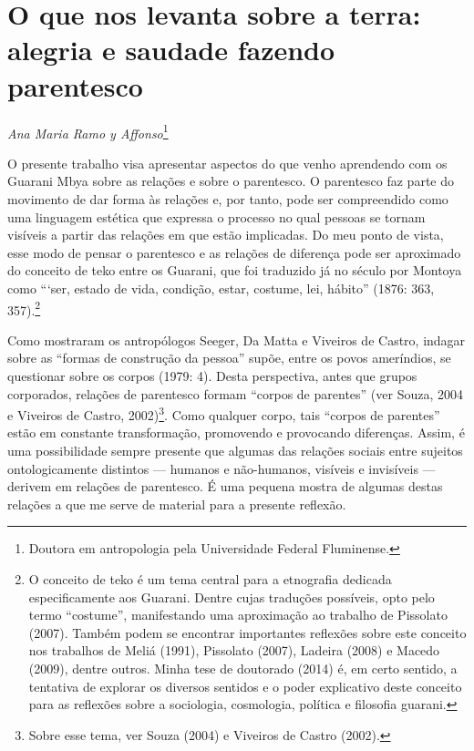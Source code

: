\chapter{O que nos levanta sobre a terra: alegria e saudade fazendo
parentesco}
\begin{flushright}
\emph{Ana Maria Ramo y Affonso}\footnote{Doutora em antropologia pela
Universidade Federal Fluminense.}
\end{flushright}

O presente trabalho visa apresentar aspectos do que venho aprendendo com
os Guarani Mbya sobre as relações e sobre o parentesco. O parentesco
faz parte do movimento de dar forma às relações e, por tanto, pode ser
compreendido como uma linguagem estética que expressa o processo no
qual pessoas se tornam visíveis a partir das relações em que estão
implicadas. Do meu ponto de vista, esse modo de pensar o parentesco e
as relações de diferença pode ser aproximado do conceito de teko entre
os Guarani, que foi traduzido já no século  por Montoya como ``‘ser,
estado de vida, condição, estar, costume, lei, hábito'' (1876: 363,
357).\footnote{O conceito de teko é um tema central para a etnografia
dedicada especificamente aos Guarani. Dentre cujas traduções possíveis,
opto pelo termo ``costume'', manifestando uma aproximação ao trabalho de
Pissolato (2007). Também podem se encontrar importantes reflexões sobre
este conceito nos trabalhos de Meliá (1991), Pissolato (2007), Ladeira
(2008) e Macedo (2009), dentre outros. Minha tese de doutorado (2014)
é, em certo sentido, a tentativa de explorar os diversos sentidos e o
poder explicativo deste conceito para as reflexões sobre a sociologia,
cosmologia, política e filosofia guarani.}

Como mostraram os antropólogos Seeger, Da Matta e Viveiros de Castro,
indagar sobre as ``formas de construção da pessoa'' supõe, entre os povos
ameríndios, se questionar sobre os corpos (1979: 4). Desta perspectiva,
antes que grupos corporados, relações de parentesco formam ``corpos de
parentes'' (ver Souza, 2004 e Viveiros de Castro, 2002)\footnote{Sobre
esse tema, ver Souza (2004) e Viveiros de Castro (2002).}. Como
qualquer corpo, tais ``corpos de parentes'' estão em constante
transformação, promovendo e provocando diferenças. Assim, é uma
possibilidade sempre presente que algumas das relações sociais entre
sujeitos ontologicamente distintos --- humanos e não-humanos, visíveis e
invisíveis --- derivem em relações de parentesco. É uma pequena mostra de
algumas destas relações a que me serve de material para a presente
reflexão.

